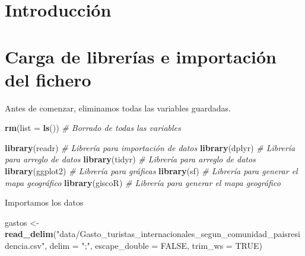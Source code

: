 \documentclass[data,article,submit,moreauthors,pdftex]{Definitions/mdpi}
\newenvironment{Shaded}{\begin{snugshade}}{\end{snugshade}}
\newcommand{\AttributeTok}[1]{\textcolor[rgb]{0.13,0.29,0.53}{#1}}
\newcommand{\CommentTok}[1]{\textcolor[rgb]{0.56,0.35,0.01}{\textit{#1}}}
\newcommand{\ConstantTok}[1]{\textcolor[rgb]{0.56,0.35,0.01}{#1}}
\newcommand{\FunctionTok}[1]{\textcolor[rgb]{0.13,0.29,0.53}{\textbf{#1}}}
\newcommand{\NormalTok}[1]{#1}
\newcommand{\OtherTok}[1]{\textcolor[rgb]{0.56,0.35,0.01}{#1}}
\newcommand{\StringTok}[1]{\textcolor[rgb]{0.31,0.60,0.02}{#1}}
\begin{document}

\section{Introducción}\label{introducciuxf3n}

\section{Carga de librerías e importación del
fichero}\label{carga-de-libreruxedas-e-importaciuxf3n-del-fichero}

Antes de comenzar, eliminamos todas las variables guardadas.

\begin{Shaded}
\begin{Highlighting}[]
\FunctionTok{rm}\NormalTok{(}\AttributeTok{list =} \FunctionTok{ls}\NormalTok{())  }\CommentTok{\# Borrado de todas las variables}
\end{Highlighting}
\end{Shaded}

\begin{Shaded}
\begin{Highlighting}[]
\FunctionTok{library}\NormalTok{(readr)  }\CommentTok{\# Librería para importación de datos}
\FunctionTok{library}\NormalTok{(dplyr)  }\CommentTok{\# Librería para arreglo de datos}
\FunctionTok{library}\NormalTok{(tidyr)  }\CommentTok{\# Librería para arreglo de datos}
\FunctionTok{library}\NormalTok{(ggplot2)  }\CommentTok{\# Librería para gráficas}
\FunctionTok{library}\NormalTok{(sf)  }\CommentTok{\# Librería para generar el mapa geográfico}
\FunctionTok{library}\NormalTok{(giscoR)  }\CommentTok{\# Librería para generar el mapa geográfico}
\end{Highlighting}
\end{Shaded}

Importamos los datos

\begin{Shaded}
\begin{Highlighting}[]
\NormalTok{gastos }\OtherTok{\textless{}{-}} \FunctionTok{read\_delim}\NormalTok{(}\StringTok{"data/Gasto\_turistas\_internacionales\_segun\_comunidad\_paisresidencia.csv"}\NormalTok{,}
    \AttributeTok{delim =} \StringTok{";"}\NormalTok{, }\AttributeTok{escape\_double =} \ConstantTok{FALSE}\NormalTok{, }\AttributeTok{trim\_ws =} \ConstantTok{TRUE}\NormalTok{)}
\end{Highlighting}
\end{Shaded}
\end{document}
